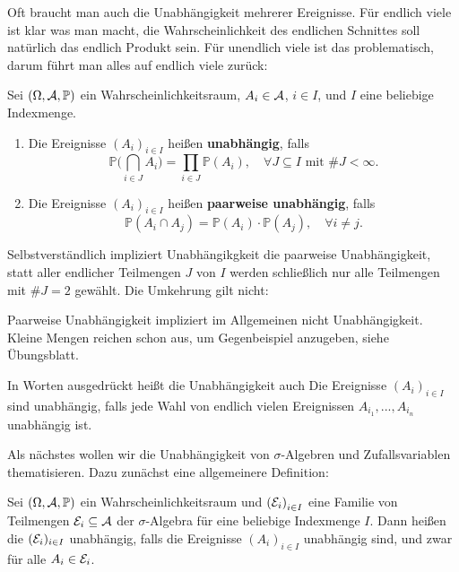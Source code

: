 Oft braucht man auch die Unabh\"angigkeit mehrerer Ereignisse. F\"ur endlich viele ist klar was man macht, die Wahrscheinlichkeit des endlichen Schnittes soll nat\"urlich das endlich Produkt sein. F\"ur unendlich viele ist das problematisch, darum f\"uhrt man alles auf endlich viele zur\"uck:
\begin{deff}
	Sei $(\Omega, \mathcal{A}, \mathbb{P})$ ein Wahrscheinlichkeitsraum, $A_i \in \mathcal{A}$, $i \in I$, und $I$ eine beliebige Indexmenge.
	\begin{enumerate}[label=(\roman*)]
		\item Die Ereignisse ${(A_i)}_{i\in I}$ heißen \textbf{unabhängig}, falls 
		\[ \mathbb{P}\big(\bigcap_{i \in J} A_i \big) = \prod\limits_{i \in J} \mathbb{P}(A_i),\quad \forall J \subseteq I \text{ mit }  \# J<\infty. \]
		\item Die Ereignisse ${(A_i)}_{i\in I}$ heißen \textbf{paarweise unabhängig}, falls 
		$$\mathbb{P}(A_i \cap A_j) = \mathbb{P}(A_i) \cdot \mathbb{P}(A_j), \quad \forall i\neq j.$$
	\end{enumerate}
\end{deff}
Selbstverst\"andlich impliziert Unabh\"angikgkeit die paarweise Unabh\"angigkeit, statt aller endlicher Teilmengen $J$ von $I$ werden schlie\ss lich nur alle Teilmengen mit $\# J=2$ gew\"ahlt. Die Umkehrung gilt nicht:
\begin{warnung}
	Paarweise Unabhängigkeit impliziert im Allgemeinen nicht Unabhängigkeit. Kleine Mengen reichen schon aus, um Gegenbeispiel anzugeben, siehe \"Ubungsblatt.
\end{warnung}
In Worten ausgedr\"uckt hei\ss t die Unabh\"angigkeit auch \glqq Die Ereignisse ${(A_i)}_{i\in I}$ sind unabh\"angig, falls jede Wahl von endlich vielen Ereignissen $A_{i_1},...,A_{i_n}$ unabh\"angig ist\grqq.\smallskip

Als n\"achstes wollen wir die Unabh\"angigkeit von $\sigma$-Algebren und Zufallsvariablen thematisieren. Dazu zun\"achst eine allgemeinere Definition:
\begin{deff}\label{Ka}
	Sei $(\Omega, \mathcal{A}, \mathbb{P})$ ein Wahrscheinlichkeitsraum und ${(\mathcal{E}_i)}_{i \in I}$ eine Familie von Teilmengen $\mathcal{E}_i \subseteq \mathcal{A}$ der $\sigma$-Algebra f\"ur eine beliebige Indexmenge $I$. Dann heißen die $(\mathcal{E}_i)_{i\in I}$ unabhängig, falls die Ereignisse ${(A_i)}_{i \in I}$ unabhängig sind, und zwar f\"ur alle $A_i \in \mathcal{E}_i$.
\end{deff}


